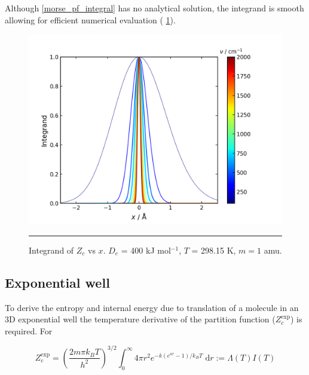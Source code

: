 \documentclass[../main.tex]{subfiles}
\begin{document}
Although \eqref{morse_pf_integral} has no analytical solution, the integrand is smooth allowing for efficient numerical evaluation (\figurename{ \ref{morse_pf_integrand_vs_x}}).

\begin{figure}[h!]
	\centering
	\includegraphics[width=12cm]{8/figs/morse_pf_integrand_vs_x}
	\vspace{0.2cm}
	\hrule
	\caption{Integrand of $Z_c$ vs $x$. $D_e$ = 400 kJ mol$^{-1}$, $T$ = 298.15 K, $m = 1$ amu.}
	\label{morse_pf_integrand_vs_x}
\end{figure}

\subsection{Exponential well}

To derive the entropy and internal energy due to translation of a molecule in an 3D exponential well the temperature derivative of the partition function ($Z_c^\text{exp}$) is required. For

\begin{equation}
	Z_c^\text{exp} =\left(\frac{2m\pi k_B T}{h^2} \right)^{3/2} \int_0^\infty 4\pi r^2 e^{- k(e^{ar} - 1) / k_B T} \; \text{d}r :=  \Lambda(T) I(T)
\end{equation}
\end{document}

